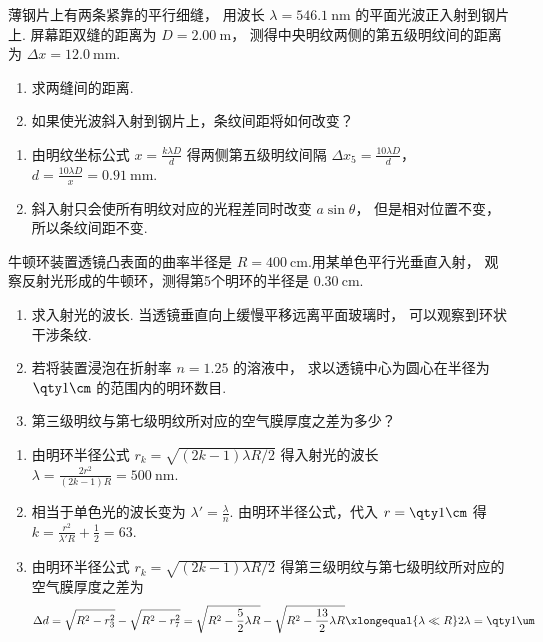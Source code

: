 \begin{problem}[本题5分]
  薄钢片上有两条紧靠的平行细缝，
  用波长 $\lambda = \qty{546.1}\nm$ 的平面光波正入射到钢片上. 
  屏幕距双缝的距离为 $D = \qty{2.00}\m$，
  测得中央明纹两侧的第五级明纹间的距离为 $\Delta x = \qty{12.0}\mm$.
  \begin{enumerate}
    \item 求两缝间的距离.
    \item 如果使光波斜入射到钢片上，条纹间距将如何改变？
  \end{enumerate}
\end{problem}
\scratch[4ex]
\begin{solution}\leavevmode
  \begin{enumerate}
    \item 由明纹坐标公式 $x = \frac{k\lambda D}{d}$ 得两侧第五级明纹间隔
    $\Delta x_5 = \frac{10\lambda D}{d}$，
    $d = \frac{10\lambda D}{x} = \qty{0.91}\mm$.
    \item 斜入射只会使所有明纹对应的光程差同时改变 $a\sin\theta$，
    但是相对位置不变，所以条纹间距不变.
  \end{enumerate}
\end{solution}

\begin{problem}[本题7分]
  牛顿环装置透镜凸表面的曲率半径是 $R = \qty{400}\cm$.用某单色平行光垂直入射，
  观察反射光形成的牛顿环，测得第5个明环的半径是 $\qty{0.30}\cm$.
  \begin{enumerate}
    \item 求入射光的波长. 当透镜垂直向上缓慢平移远离平面玻璃时，
    可以观察到环状干涉条纹.
    \item 若将装置浸泡在折射率 $n = 1.25$ 的溶液中，
    求以透镜中心为圆心在半径为 $\qty1\cm$ 的范围内的明环数目.
    \item 第三级明纹与第七级明纹所对应的空气膜厚度之差为多少？
  \end{enumerate}
\end{problem}
\scratch[4ex]
\begin{solution}\leavevmode
  \begin{enumerate}
    \item 由明环半径公式 $r_k = \sqrt{(2k - 1)\lambda R/2}$
    得入射光的波长 $\lambda = \frac{2r^2}{(2k - 1)R} = \qty{500}\nm$.
    \item 相当于单色光的波长变为 $\lambda' = \frac\lambda n$.
    由明环半径公式，代入 $r = \qty1\cm$
    得 $k = \frac{r^2}{\lambda' R} + \frac12 = 63$.
    \item 由明环半径公式 $r_k = \sqrt{(2k - 1)\lambda R/2}$
    得第三级明纹与第七级明纹所对应的空气膜厚度之差为
    \[
        \Delta d = \sqrt{R^2 - r_3^2} - \sqrt{R^2 - r_7^2}
      = \sqrt{R^2 - \frac52\lambda R} - \sqrt{R^2 - \frac{13}{2}\lambda R}
      \xlongequal{\lambda \ll R} 2\lambda = \qty1\um
    \]
  \end{enumerate}
\end{solution}


